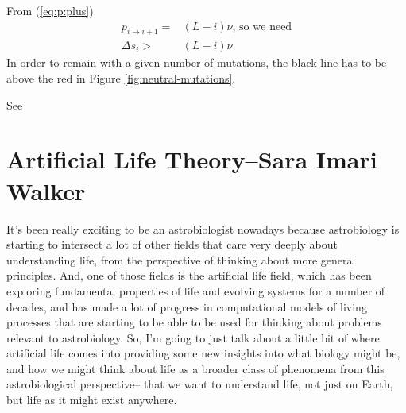 \documentclass[]{article}
\begin{document}
From (\ref{eq:p:plus})
\begin{align*}
	p_{i\rightarrow i+1} =& (L-i)\nu \text{, so we need}\\
	\Delta s_i > & (L-i)\nu
\end{align*}
In order to remain with a given number of mutations, the black line has to be above the red in Figure \ref{fig:neutral-mutations}.

See \cite{eigen1978hypercycle,eigen1988molecular,eigen2002error,crotty2001rna,stadtler2002fitness_landscapes,wessner2010origins}


\section[Artificial Life Theory]{Artificial Life Theory--Sara Imari Walker}

It's been really exciting
to be an astrobiologist nowadays
because astrobiology is starting to
intersect a lot of other fields
that care very deeply about
understanding life,
from the perspective of thinking about
more general principles.
And, one of those fields is
the artificial life field,
which has been exploring
fundamental properties of life
and evolving systems
for a number of decades,
and has made a lot of progress
in computational models
of living processes that are starting to
be able to be used for thinking
about problems relevant to astrobiology.
So, I'm going to just talk about
a little bit of where artificial life comes
into providing some new insights
into what biology might be,
and how we might think about life
as a broader class of phenomena
from this astrobiological perspective--
that we want to understand life, not just on Earth, but life as it might exist anywhere.
\end{document}
